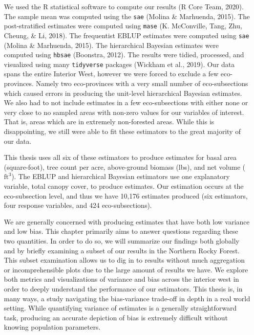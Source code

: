 \documentclass[12pt,twoside]{reedthesis}
\begin{document}
We used the R statistical software to compute our results (R Core Team, 2020). The sample mean was computed using the \texttt{sae} (Molina \& Marhuenda, 2015). The post-stratified estimates were computed using \texttt{mase} (K. McConville, Tang, Zhu, Cheung, \& Li, 2018). The frequentist EBLUP estimates were computed using \texttt{sae} (Molina \& Marhuenda, 2015). The hierarchical Bayesian estimates were computed using \texttt{hbsae} (Boonstra, 2012). The results were tidied, processed, and visualized using many \texttt{tidyverse} packages (Wickham et al., 2019). Our data spans the entire Interior West, however we were forced to exclude a few eco-provinces. Namely two eco-provinces with a very small number of eco-subsections which caused errors in producing the unit-level hierarchical Bayesian estimates. We also had to not include estimates in a few eco-subsections with either none or very close to no sampled areas with non-zero values for our variables of interest. That is, areas which are in extremely non-forested areas. While this is disappointing, we still were able to fit these estimators to the great majority of our data.

This thesis uses all six of these estimators to produce estimates for basal area (square-foot), tree count per acre, above-ground biomass (lbs), and net volume (\(\text{ft}^3\)). The EBLUP and hierarchical Bayesian estimators use one explanatory variable, total canopy cover, to produce estimates. Our estimation occurs at the eco-subsection level, and thus we have 10,176 estimates produced (six estimators, four response variables, and 424 eco-subsections).

We are generally concerned with producing estimates that have both low variance and low bias. This chapter primarily aims to answer questions regarding these two quantities. In order to do so, we will summarize our findings both globally and by briefly examining a subset of our results in the Northern Rocky Forest. This subset examination allows us to dig in to results without much aggregation or incomprehensible plots due to the large amount of results we have. We explore both metrics and visualizations of variance and bias across the interior west in order to deeply understand the performance of our estimators. This thesis is, in many ways, a study navigating the bias-variance trade-off in depth in a real world setting. While quantifying variance of estimates is a generally straightforward task, producing an accurate depiction of bias is extremely difficult without knowing population parameters.
\end{document}
